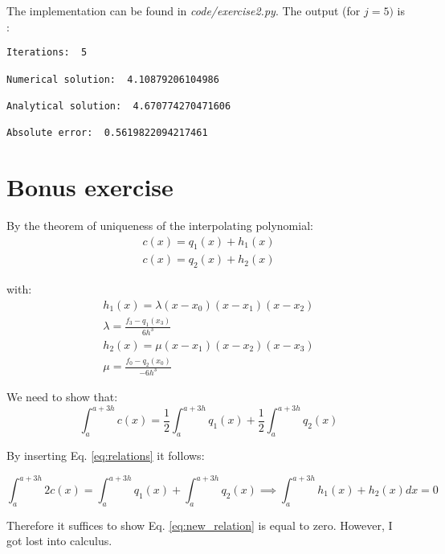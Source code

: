\documentclass[12pt]{article}
\begin{document}
The implementation can be found in \textit{code/exercise2.py}. The output (for $j = 5)$ is : \\

\begin{center}
\begin{lstlisting}
Iterations:  5

Numerical solution:  4.10879206104986

Analytical solution:  4.670774270471606

Absolute error:  0.5619822094217461
\end{lstlisting}
	
\end{center}


\section*{Bonus exercise}

By the theorem of uniqueness of the interpolating polynomial: \\

\begin{equation}
	\begin{split}
			c(x) = q_1(x) + h_1(x) \\
			c(x) = q_2(x) + h_2(x) 
	\end{split}
\end{equation}

with: \\
\begin{equation}
	\begin{split}
		h_1(x) = \lambda (x-x_0) (x-x_1) (x-x_2) \\
		\lambda = \frac{f_3 - q_1(x_3)}{6h^3} \\
		h_2(x) = \mu (x-x_1) (x-x_2) (x-x_3) \\
		\mu = \frac{f_0 - q_2(x_0)}{-6h^3}		
	\end{split}
	\label{eq:relations}
\end{equation}

We need to show that: 
\begin{equation}
	\int_a^{a+3h} c(x) = \frac{1}{2} \int_a^{a+3h} q_1(x) + \frac{1}{2} \int_a^{a+3h} q_2(x)
\end{equation}

By inserting Eq. \ref{eq:relations} it follows: 

\begin{equation}
	\int_a^{a+3h} 2 c(x) = \int_a^{a+3h} q_1(x) + \int_a^{a+3h} q_2(x)
	\implies \int_a^{a+3h} h_1(x) + h_2(x) dx = 0
	\label{eq:new_relation}
\end{equation}

Therefore it suffices to show Eq. \ref{eq:new_relation} is equal to zero. However, I got lost into calculus. 
\end{document}
